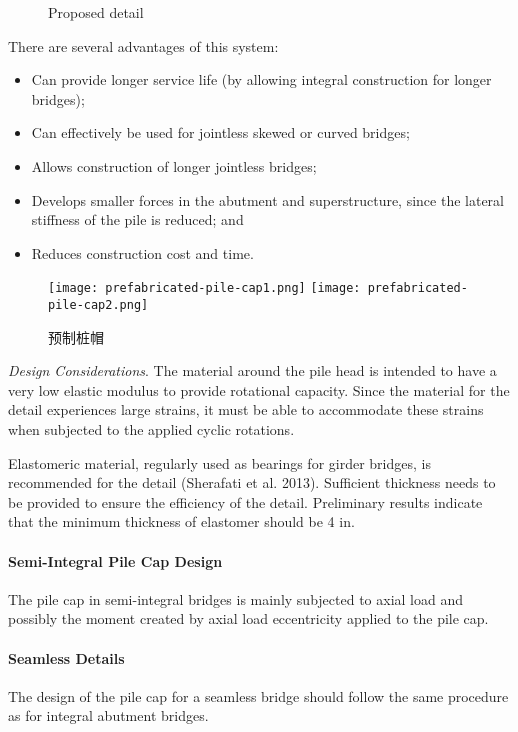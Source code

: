 \begin{figure}
  \caption{Proposed detail}
  \label{fig:proposed-detail}
\end{figure}

There are several advantages of this system:
\begin{itemize}
  \item Can provide longer service life (by allowing integral construction for longer bridges);
  \item Can effectively be used for jointless skewed or curved bridges;
  \item Allows construction of longer jointless bridges;
  \item Develops smaller forces in the abutment and superstructure, since the lateral stiffness of the pile is reduced; and
  \item Reduces construction cost and time.
\end{itemize}

\begin{figure}
  \texttt{[image: prefabricated-pile-cap1.png]}
  \texttt{[image: prefabricated-pile-cap2.png]}
  \caption{预制桩帽}
  \label{fig:prefabricated-pile-cap}
\end{figure}

\emph{Design Considerations}. The material around the pile head is intended to have a very low elastic modulus to provide rotational capacity. Since the material for the detail experiences large strains, it must be able to accommodate these strains when subjected to the applied cyclic rotations.

Elastomeric material, regularly used as bearings for girder bridges, is recommended for the detail (Sherafati et al. 2013). Sufficient thickness needs to be provided to ensure the efficiency of the detail. Preliminary results indicate that the minimum thickness of elastomer should be 4 in.

\paragraph{Semi-Integral Pile Cap Design}
The pile cap in semi-integral bridges is mainly subjected to axial load and possibly the moment created by axial load eccentricity applied to the pile cap.
\paragraph{Seamless Details}
The design of the pile cap for a seamless bridge should follow the same procedure as for integral abutment bridges.

